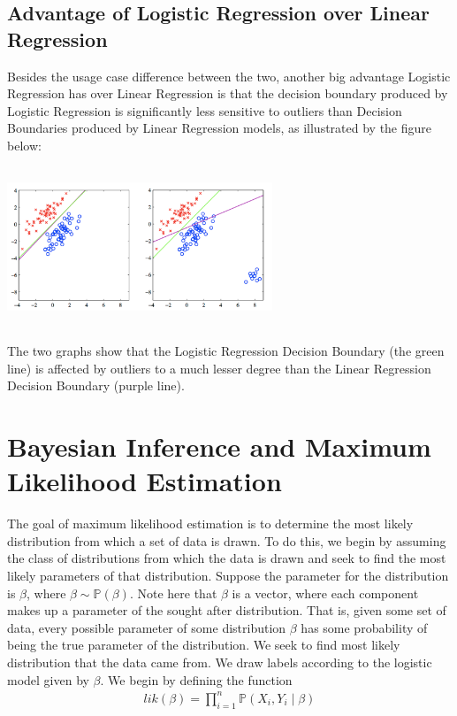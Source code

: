 \documentclass[a4paper]{article}
\begin{document}
\subsection{Advantage of Logistic Regression over Linear Regression}
Besides the usage case difference between the two, another big advantage Logistic Regression has over Linear Regression is that the decision boundary produced by Logistic Regression is significantly less sensitive to outliers than Decision Boundaries produced by Linear Regression models, as illustrated by the figure below:
\begin{center}
    \includegraphics[width=300px, height=180px]{outlier_influence.png}
\end{center}
The two graphs show that the Logistic Regression Decision Boundary (the green line) is affected by outliers to a much lesser degree than the Linear Regression Decision Boundary (purple line).

\section{Bayesian Inference and Maximum Likelihood Estimation}

The goal of maximum likelihood estimation is to determine the most likely distribution from which a set of data is drawn. To do this, we begin by assuming the class of distributions from which the data is drawn and seek to find the most likely parameters of that distribution. Suppose the parameter for the distribution is $\beta$, where $\beta\sim\mathbb{P}(\beta)$. Note here that $\beta$ is a vector, where each component makes up a parameter of the sought after distribution. That is, given some set of data, every possible parameter of some distribution $\beta$ has some probability of being the true parameter of the distribution. We seek to find most likely distribution that the data came from. We draw labels according to the logistic model given by $\beta$. We begin by defining the function 
\begin{align*}
lik(\beta)=\prod_{i=1}^{n} \mathbb{P}(X_i,Y_i \mid \beta)
\end{align*}
\end{document}
